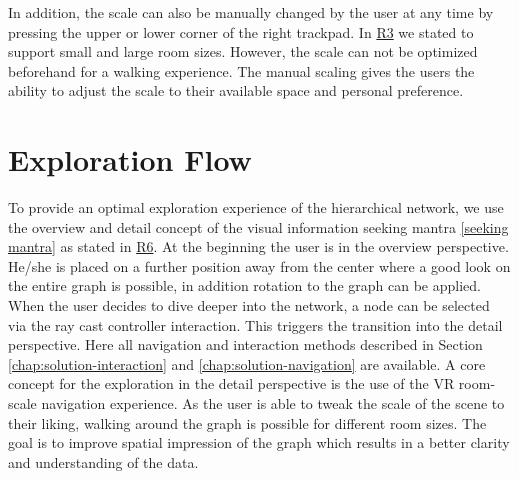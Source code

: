 In addition, the scale can also be manually changed by the user at any time by pressing the upper or lower corner of the right trackpad. 
In \hyperref[req:R3]{R3} we stated to support small and large room sizes.  However, the scale can not be optimized beforehand for a walking experience. The manual scaling gives the users the ability to adjust the scale to their available space and personal preference.
\section{Exploration Flow}
\label{chap:ps-explorationFlow}
To provide an optimal exploration experience of the hierarchical network, we use the overview and detail concept of the visual information seeking mantra \ref{seeking mantra} as stated in \hyperref[req:R6]{R6}. 
At the beginning the user is in the overview perspective. He/she is placed on a further position away from the center where a good look on the entire graph is possible, in addition rotation to the graph can be applied.
When the user decides to dive deeper into the network, a node can be selected via the ray cast controller interaction. This triggers the transition into the detail perspective. 
Here all navigation and interaction methods described in Section \ref{chap:solution-interaction} and \ref{chap:solution-navigation}
are available. 
A core concept for the exploration in the detail perspective is the use of the VR room-scale navigation experience. As the user is able to tweak the scale of the scene to their liking, walking around the graph is possible for different room sizes. The goal is to improve spatial impression of the graph which results in a better clarity and understanding of the data.


